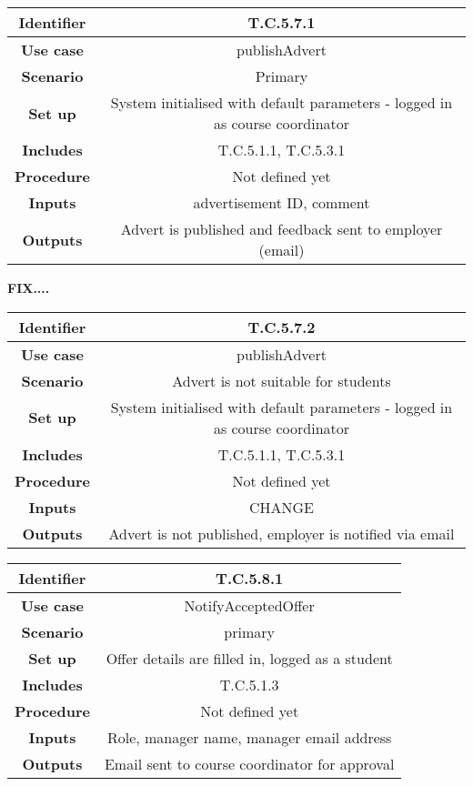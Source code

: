\begin{tabular}{|c|c|}
\hline \textbf{Identifier} & T.C.5.7.1\\
\hline \textbf{Use case} & publishAdvert\\
\hline \textbf{Scenario} & Primary\\
\hline \textbf{Set up} & System initialised with default parameters - logged in as course coordinator\\
\hline \textbf{Includes} & T.C.5.1.1, T.C.5.3.1\\
\hline \textbf{Procedure} & Not defined yet\\
\hline \textbf{Inputs} & advertisement ID, comment\\
\hline \textbf{Outputs} & Advert is published and feedback sent to employer (email)\\
\hline
\end{tabular}

\textbf{FIX....}
\begin{tabular}{|c|c|}
\hline \textbf{Identifier} & T.C.5.7.2\\
\hline \textbf{Use case} & publishAdvert\\
\hline \textbf{Scenario} & Advert is not suitable for students\\
\hline \textbf{Set up} & System initialised with default parameters - logged in as course coordinator\\
\hline \textbf{Includes} & T.C.5.1.1, T.C.5.3.1\\
\hline \textbf{Procedure} & Not defined yet\\
\hline \textbf{Inputs} & CHANGE\\
\hline \textbf{Outputs} & Advert is not published, employer is notified via email\\
\hline
\end{tabular}

\begin{tabular}{|c|c|}
\hline \textbf{Identifier} & T.C.5.8.1\\
\hline \textbf{Use case} & NotifyAcceptedOffer\\
\hline \textbf{Scenario} & primary\\
\hline \textbf{Set up} & Offer details are filled in, logged as a student\\
\hline \textbf{Includes} & T.C.5.1.3\\
\hline \textbf{Procedure} & Not defined yet\\
\hline \textbf{Inputs} & Role, manager name, manager email address\\
\hline \textbf{Outputs} & Email sent to course coordinator for approval\\
\hline
\end{tabular}

